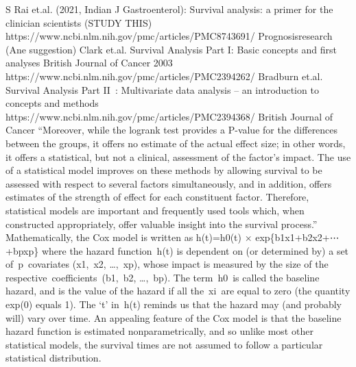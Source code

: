 \documentclass{article}%
\begin{document}
%
S Rai et.al. (2021, Indian J Gastroenterol): Survival analysis: a primer for the clinician scientists (STUDY THIS)%
\newline%
\newline%
%
https://www.ncbi.nlm.nih.gov/pmc/articles/PMC8743691/ %
\newline%
\newline%
%
Prognosisresearch (Ane suggestion) %
\newline%
\newline%
%
Clark et.al. Survival Analysis Part I: Basic concepts and first analyses%
\newline%
\newline%
%
British Journal of Cancer 2003 %
\newline%
\newline%
%
https://www.ncbi.nlm.nih.gov/pmc/articles/PMC2394262/ %
\newline%
\newline%
%
Bradburn et.al. Survival Analysis Part II~: Multivariate data analysis – an introduction to concepts and methods%
\newline%
\newline%
%
https://www.ncbi.nlm.nih.gov/pmc/articles/PMC2394368/ %
\newline%
\newline%
%
British Journal of Cancer %
\newline%
\newline%
%
“Moreover, while the logrank test provides a P{-}value for the differences between the groups, it offers no estimate of the actual effect size; in other words, it offers a statistical, but not a clinical, assessment of the factor's impact. The use of a statistical model improves on these methods by allowing survival to be assessed with respect to several factors simultaneously, and in addition, offers estimates of the strength of effect for each constituent factor. Therefore, statistical models are important and frequently used tools which, when constructed appropriately, offer valuable insight into the survival process.”%
\newline%
\newline%
%
Mathematically, the Cox model is written as%
\newline%
\newline%
%
h(t)=h0(t) × exp\{b1x1+b2x2+⋯+bpxp\}%
\newline%
\newline%
%
where the hazard function~h(t) is dependent on (or determined by) a set of~p~covariates (x1,~x2, …,~xp), whose impact is measured by the size of the respective~coefficients~(b1,~b2, …,~bp). The term~h0~is called the baseline hazard, and is the value of the hazard if all the~xi~are equal to zero (the quantity exp(0) equals 1). The ‘t’ in~h(t) reminds us that the hazard may (and probably will) vary over time. An appealing feature of the Cox model is that the baseline hazard function is estimated nonparametrically, and so unlike most other statistical models, the survival times are not assumed to follow a particular statistical distribution.%
\end{document}
